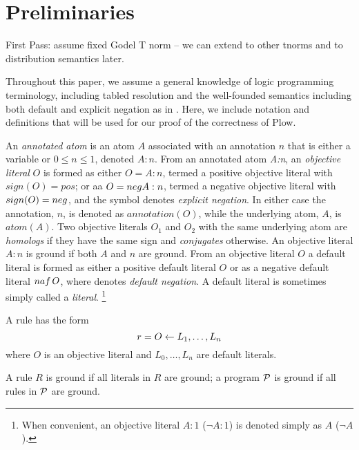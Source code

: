 \section{Preliminaries}\label{sec:prelim}
%
{\sc First Pass: assume fixed Godel T norm -- we can extend to other
  tnorms and to distribution semantics later.  
}

Throughout this paper, we assume a general knowledge of logic
programming terminology, including tabled resolution and the
well-founded semantics including both default and explicit negation as
in \cite{AlDP95}.  Here, we include notation and definitions that will
be used for our proof of the correctness of Plow.

An {\em annotated atom} is an atom $A$ associated with an annotation
$n$ that is either a variable or $0 \leq n \leq 1$, denoted $A:n$.
From an annotated atom {\em A:n}, an {\em objective literal} $O$ is
formed as either $O = A:n$, termed a positive objective literal with
$sign(O) = pos$; or aa $O = neg A:n$, termed a negative objective
literal with $sign(O) = neg$, and the \ourneg{} symbol denotes
{\em explicit negation}.  In either case the annotation, $n$, is
denoted as $ annotation(O)$, while the underlying atom, $A$, is
$atom(A)$.
%
Two objective literals $O_1$ and $O_2$ with the same underlying atom
are {\em homologs} if they have the same sign and {\em conjugates}
otherwise.  An objective literal $A:n$ is ground if both $A$ and $n$
are ground.
%
%
From an objective literal $O$ a default literal is formed as either a
positive default literal $O$ or as a negative default literal ${naf}\,
O$, where \naf{} denotes {\em default negation}.  A default literal is
sometimes simply called a {\em literal}.
\footnote{
When convenient, an objective literal $A:1$ ($\neg A:1$) is denoted
simply as $A$ ($\neg A$).}

A rule has the form
\[r = O \leftarrow{} L_1,\ldots,L_n\]
where $O$ is an objective literal and $L_0,\ldots,L_n$ are default
literals.

A rule $R$ is ground if all literals in $R$ are ground; a program
$\cP$ is ground if all rules in $\cP$ are ground.




